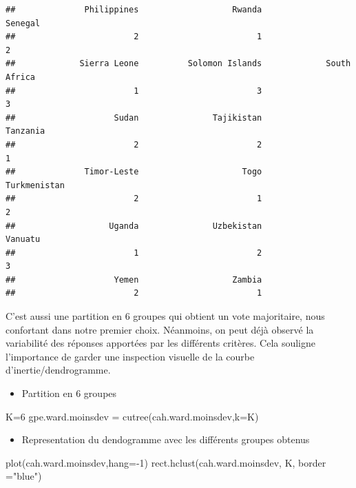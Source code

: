 \documentclass[
]{article}
\newenvironment{Shaded}{}{}
\newcommand{\AttributeTok}[1]{#1}
\newcommand{\DecValTok}[1]{#1}
\newcommand{\FunctionTok}[1]{#1}
\newcommand{\NormalTok}[1]{#1}
\newcommand{\OtherTok}[1]{\textcolor[rgb]{1.00,0.25,0.00}{#1}}
\newcommand{\SpecialCharTok}[1]{\textcolor[rgb]{0.00,0.50,0.50}{#1}}
\newcommand{\StringTok}[1]{\textcolor[rgb]{0.00,0.50,0.50}{#1}}
\providecommand{\tightlist}{%
  \setlength{\itemsep}{0pt}\setlength{\parskip}{0pt}}
\begin{document}
\begin{verbatim}
##              Philippines                   Rwanda                  Senegal 
##                        2                        1                        2 
##             Sierra Leone          Solomon Islands             South Africa 
##                        1                        3                        3 
##                    Sudan               Tajikistan                 Tanzania 
##                        2                        2                        1 
##              Timor-Leste                     Togo             Turkmenistan 
##                        2                        1                        2 
##                   Uganda               Uzbekistan                  Vanuatu 
##                        1                        2                        3 
##                    Yemen                   Zambia 
##                        2                        1
\end{verbatim}

C'est aussi une partition en 6 groupes qui obtient un vote majoritaire,
nous confortant dans notre premier choix. Néanmoins, on peut déjà
observé la variabilité des réponses apportées par les différents
critères. Cela souligne l'importance de garder une inspection visuelle
de la courbe d'inertie/dendrogramme.

\begin{itemize}
\tightlist
\item
  Partition en 6 groupes
\end{itemize}

\begin{Shaded}
\begin{Highlighting}[]
\NormalTok{K}\OtherTok{=}\DecValTok{6}
\NormalTok{gpe.ward.moinsdev }\OtherTok{=} \FunctionTok{cutree}\NormalTok{(cah.ward.moinsdev,}\AttributeTok{k=}\NormalTok{K)}
\end{Highlighting}
\end{Shaded}

\begin{itemize}
\tightlist
\item
  Representation du dendogramme avec les différents groupes obtenus
\end{itemize}

\begin{Shaded}
\begin{Highlighting}[]
\FunctionTok{plot}\NormalTok{(cah.ward.moinsdev,}\AttributeTok{hang=}\SpecialCharTok{{-}}\DecValTok{1}\NormalTok{)}
\FunctionTok{rect.hclust}\NormalTok{(cah.ward.moinsdev, K, }\AttributeTok{border =}\StringTok{"blue"}\NormalTok{)}
\end{Highlighting}
\end{Shaded}
\end{document}
